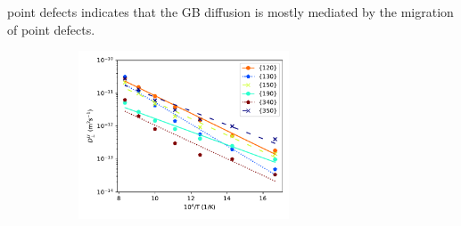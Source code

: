 \documentclass{elsarticle}
\providecommand{\DIFadd}[1]{{\protect\color{blue} \sf #1}} %
\providecommand{\DIFdel}[1]{}
\providecommand{\DIFaddbegin}{} %
\providecommand{\DIFaddend}{} %
\providecommand{\DIFdelbegin}{} %
\providecommand{\DIFdelend}{} %
\providecommand{\DIFaddbeginFL}{} %
\providecommand{\DIFaddendFL}{} %
\providecommand{\DIFdelbeginFL}{} %
\providecommand{\DIFdelendFL}{} %
\begin{document}
point defects indicates that the GB diffusion is \DIFdelbegin \DIFdel{not solely }\DIFdelend \DIFaddbegin \DIFadd{mostly }\DIFaddend mediated by the migration of point defects.
\DIFdelbegin \DIFdel{It also suggests that the GBs in $\gamma$U-Mo have highly disordered regions, where discernible point defects might be nonexistent.
}\DIFdelend 

\begin{figure}[!ht]
\DIFdelbeginFL %
\DIFdelendFL \centering
\DIFaddbeginFL \begin{subfigure}{0.45\textwidth}
	\centering
	\DIFaddendFL \caption{}
	\DIFdelbeginFL %
\DIFdelendFL \DIFaddbeginFL \includegraphics[height=5cm]{u10mo_U_Dx.pdf}
\DIFaddendFL \end{subfigure}
\DIFdelbeginFL %


\end{figure}
\end{document}
